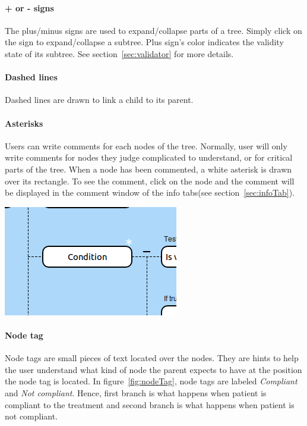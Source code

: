 \documentclass[a4paper,11pt]{report}
\begin{document}
\paragraph{+ or - signs}
The plus/minus signs are used to expand/collapse parts of a tree. Simply click on the sign to expand/collapse a subtree. Plus sign's color indicates the validity state of its subtree. See section~\ref{sec:validator} for more details.

\paragraph{Dashed lines}
Dashed lines are drawn to link a child to its parent. 

\paragraph{Asterisks}
Users can write comments for each nodes of the tree. Normally, user will only write comments for nodes they judge complicated to understand, or for critical parts of the tree. When a node has been commented, a white asterisk is drawn over its rectangle. To see the comment, click on the node and the comment will be displayed in the comment window of the info tabs(see section~\ref{sec:infoTab}).
 
\begin{center}
\includegraphics[scale=0.4]{Pictures/TreeEditor/nodeAsterisk.png}
\end{center}

\paragraph{Node tag}
Node tags are small pieces of text located over the nodes. They are hints to help the user understand what kind of node the parent expects to have at the position the node tag is located. In figure~\ref{fig:nodeTag}, node tags are labeled \emph{Compliant} and \emph{Not compliant}. Hence, first branch is what happens when patient is compliant to the treatment and second branch is what happens when patient is not compliant.
 
\end{document}

